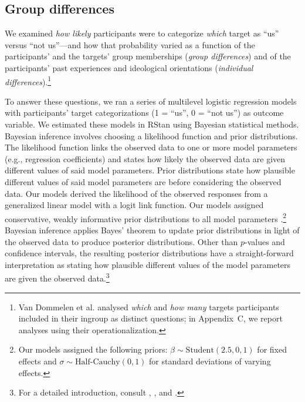 \documentclass[12pt, a4paper]{article}
\begin{document}
\subsection{Group differences}

We examined \emph{how likely} participants were to categorize \emph{which} target as ``us'' versus ``not us''---and how that probability varied as a function of the participants' and the targets' group memberships (\emph{group differences}) and of the participants' past experiences and ideological orientations (\emph{individual differences}).\footnote{Van Dommelen et al. \citeyear{dommelen_construing_2015} analysed \emph{which} and \emph{how many} targets participants included in their ingroup as distinct questions; in Appendix~C, we report analyses using their operationalization.}

To answer these questions, we ran a series of multilevel logistic regression models with participants' target categorizations (1 = ``us'', 0 = ``not us'') as outcome variable. We estimated these models in RStan \cite{rstan_package} using Bayesian statistical methods. Bayesian inference involves choosing a likelihood function and prior distributions. The likelihood function links the observed data to one or more model parameters (e.g., regression coefficients) and states how likely the observed data are given different values of said model parameters. Prior distributions state how plausible different values of said model parameters are before considering the observed data. Our models derived the likelihood of the observed responses from a generalized linear model with a logit link function. Our models assigned conservative, weakly informative prior distributions to all model parameters \cite{gelman_prior_2017}.\footnote{Our models assigned the following priors: $\beta \sim \text{Student}(2.5, 0, 1)$ for fixed effects and $\sigma \sim \text{Half-Cauchy}(0, 1)$ for standard deviations of varying effects.}  Bayesian inference applies Bayes' theorem to update prior distributions in light of the observed data to produce posterior distributions. Other than $p$-values and confidence intervals, the resulting posterior distributions have a straight-forward interpretation as stating how plausible different values of the model parameters are given the observed data.\footnote{For a detailed introduction, consult , , and	 .} 
\end{document}
